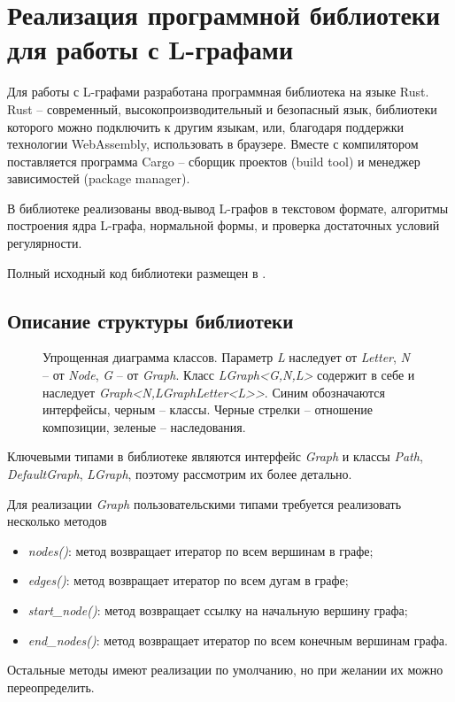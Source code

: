 
\chapter{Реализация программной библиотеки для работы с L-графами}

Для работы с L-графами разработана программная библиотека на языке Rust. 
Rust -- современный, высокопроизводительный и безопасный язык, библиотеки которого
можно подключить к другим языкам, или, благодаря поддержки технологии WebAssembly, использовать
в браузере. Вместе с компилятором поставляется программа Cargo -- сборщик проектов (build tool) и менеджер
зависимостей (package manager). 

В библиотеке реализованы ввод-вывод L-графов в текстовом формате, 
алгоритмы построения ядра L-графа, нормальной формы, и проверка достаточных условий регулярности.

Полный исходный код библиотеки размещен в \cite{github_link}.

\section{Описание структуры библиотеки}

\begin{figure}[h]
    \centering
    
    \caption{
        Упрощенная диаграмма классов. Параметр \emph{L} наследует от \emph{Letter}, \emph{N} -- от \emph{Node}, \emph{G} -- от \emph{Graph}.
        Класс \emph{LGraph<G,N,L>} содержит в себе и наследует \emph{Graph<N,LGraphLetter<L>{}>}.
        Синим обозначаются интерфейсы, черным -- классы.
        Черные стрелки -- отношение композиции, зеленые -- наследования.
    }
    \label{arch-image}
\end{figure}

Ключевыми типами в библиотеке являются интерфейс \emph{Graph} и классы \emph{Path}, \emph{DefaultGraph}, \emph{LGraph}, 
поэтому рассмотрим их более детально.

Для реализации \emph{Graph} пользовательскими типами требуется реализовать несколько методов
\begin{itemize}
    \item \emph{nodes()}: метод возвращает итератор по всем вершинам в графе;
    \item \emph{edges()}: метод возвращает итератор по всем дугам в графе;
    \item \emph{start\_node()}: метод возвращает ссылку на начальную вершину графа;
    \item \emph{end\_nodes()}: метод возвращает итератор по всем конечным вершинам графа.
\end{itemize}
Остальные методы имеют реализации по умолчанию, но при желании их можно переопределить.

